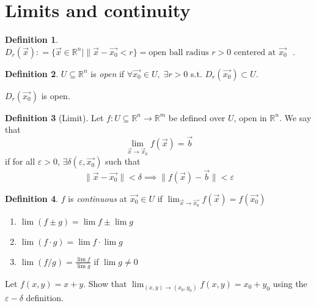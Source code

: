 \documentclass[12pt]{book}
\theoremstyle{definition}
\newtheorem{definition}{Definition}[section]
\theoremstyle{remark}
\begin{document}
\section{Limits and continuity}%
  \label{sub:Limits and continuity}
  \begin{definition}
   $D_r (\vec{{x}}) : = \{\vec{{x}}  \in \mathbb{R}^n \mid \| \vec{{x}} - \vec{{x_0}} < r\} = \text{open ball radius $r>0$ centered at $\vec{{x_0}}$ }$.
  
  \end{definition}
  \begin{definition}
    $U\subseteq \mathbb{R}^n$ is \textit{open} if $\forall \vec{{x_0}} \in U, \; \exists r>0 $ s.t. $D_r(\vec{{x_0}}) \subset U$.  
  \end{definition}
  \begin{proposition}
   $D_r(\vec{{x_0}})$ is open. 
  \end{proposition}
  \begin{definition}[Limit]
    Let $f:U\subseteq \mathbb{R}^n \rightarrow \mathbb{R}^m$ be defined over $U$, open in $\mathbb{R}^n$. We say that  $$\lim_{\vec{{x}} \rightarrow \vec{{x}}_0 }f(\vec{{x}}) = \vec{{b}}$$
    if for all $\varepsilon > 0 $, $\exists \delta (\varepsilon, \vec{{x_0}} )$ such that $$\|\vec{{x}} -\vec{{x_0}} \| < \delta \implies \|f(\vec{{x}}) -\vec{{b}}  \| < \varepsilon$$
  \end{definition}
  \begin{definition}
    $f$ is \textit{continuous} at $\vec{{x_0}} \in U$ if $\lim_{\vec{{x}} \rightarrow \vec{{x_0}} } f(\vec{{x}} ) = f(\vec{{x_0}})$ 
\end{definition}
\begin{proposition}

\begin{enumerate}$  $
  \item $\lim (f \pm g) = \lim f \pm \lim g$ 
  \item $\lim (f\cdot g) = \lim f \cdot \lim g$
  \item $\lim (f / g) = \frac{\lim f}{\lim g}$ if $\lim g \neq 0$ 
\end{enumerate}
\end{proposition}
\begin{example}
  Let $f(x,y) = x+y$. Show that $\lim_{(x,y) \rightarrow (x_0, y_0)} f(x,y) = x_0 +y_0$ using the $\varepsilon -\delta$ definition.
\end{example}
\end{document}
